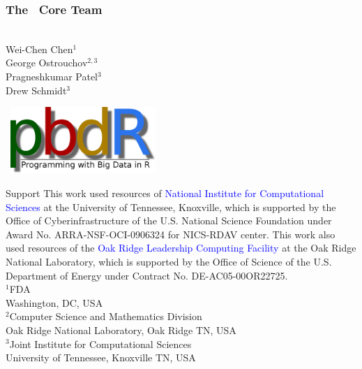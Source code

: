 \frame{\maketitle}

\setcounter{footnote}{0}

\begin{frame}[noframenumbering]
\frametitle{The \pbdR\ Core Team}
\begin{minipage}{1\textwidth}
  \vspace{-.6cm}
\begin{minipage}{3.6cm}
\ \\[.8cm]
Wei-Chen Chen$^1$ \\
George Ostrouchov$^{2,3}$ \\
Pragneshkumar Patel$^3$ \\
Drew Schmidt$^3$\\[2ex]
\end{minipage}
\begin{minipage}{7cm}
  \ \hfill \includegraphics[width=5.5cm]{../common/pics/logos/newpbdr}
\end{minipage}
\end{minipage}

\vspace{-.4cm}
\begin{block}{Support}\tiny
  This work used resources of \textcolor{blue}{National Institute for
  Computational Sciences} at the University of Tennessee, Knoxville,
  which is supported by the Office of Cyberinfrastructure of the
  U.S. National Science Foundation under Award  No. ARRA-NSF-OCI-0906324 
  for NICS-RDAV center. 
  This work also used resources of the \textcolor{blue}{Oak Ridge
  Leadership Computing Facility} at the Oak Ridge National
  Laboratory, which is supported by the Office of Science of the
  U.S. Department of Energy under Contract No. DE-AC05-00OR22725.\\[.2cm]
  
  $^1$FDA\\
  Washington, DC, USA\\[.2cm]

  $^2$Computer Science and Mathematics Division\\
  Oak Ridge National Laboratory, Oak Ridge TN, USA\\[.2cm]
  
  $^3$Joint Institute for Computational Sciences\\
  University of Tennessee, Knoxville TN, USA
\end{block}
\end{frame}



